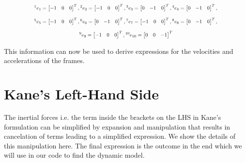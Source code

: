 \documentclass[a4paper,10pt]{article}
\newcommand\scalemath[2]{\scalebox{#1}{\mbox{\ensuremath{\displaystyle #2}}}}
\begin{document}
\[
\scalemath{0.75}{{}^1e_1 = \left[\begin{matrix}-1 & 0 & 0\end{matrix}\right]^T, 
{}^2e_2 = \left[\begin{matrix}-1 & 0 & 0\end{matrix}\right]^T, 
{}^3e_3 = \left[\begin{matrix}0 & -1 & 0\end{matrix}\right]^T, 
{}^4e_4 = \left[\begin{matrix}0 & -1 & 0\end{matrix}\right]^T,}
\]
\[
\scalemath{0.75}{{}^5e_5 = \left[\begin{matrix}-1 & 0 & 0\end{matrix}\right]^T, 
{}^6e_6 = \left[\begin{matrix}0 & -1 & 0\end{matrix}\right]^T, 
{}^7e_7 = \left[\begin{matrix}-1 & 0 & 0\end{matrix}\right]^T, 
{}^8e_8 = \left[\begin{matrix}0 & -1 & 0\end{matrix}\right]^T,}
\]
\[
\scalemath{0.75}{{}^9e_9 = \left[\begin{matrix}-1 & 0 & 0\end{matrix}\right]^T, 
{}^{10}e_{10} = \left[\begin{matrix}0 & 0 & -1\end{matrix}\right]^T}
\]

This information can now be used to derive expressions for the velocities and accelerations of the frames.

\section{Kane's Left-Hand Side}
The inertial forces i.e. the term inside the brackets on the LHS in Kane's formulation can be simplified by expansion
and manipulation that results in cancelation of terms leading to a simplified expression. We show the details of this
manipulation here. The final expression is the outcome in the end which we will use in our code to find the
dynamic model.
\end{document}
